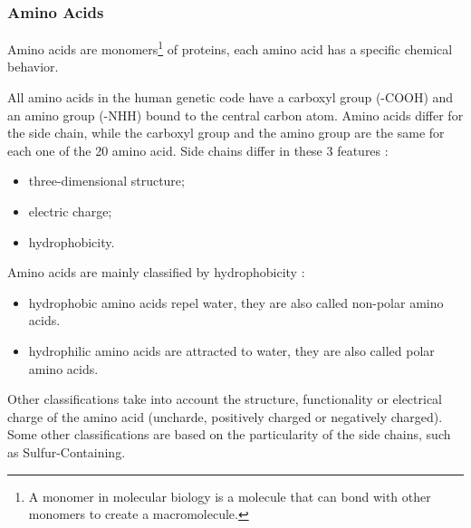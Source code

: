 \subsubsection{Amino Acids}
Amino acids are monomers\footnote{A monomer in molecular biology is a molecule that can bond with other monomers to create a macromolecule. } of proteins, each amino acid has a specific chemical behavior.

All amino acids in the human genetic code have a carboxyl group (-COOH) and an amino group (-NHH) bound to the central carbon atom. Amino acids differ for the side chain, while the carboxyl group and the amino group are the same for each one of the 20 amino acid. Side chains differ in these 3 features :
\begin{itemize}
	\item three-dimensional structure;
	\item electric charge;
	\item hydrophobicity.
\end{itemize}

Amino acids are mainly classified by hydrophobicity :
\begin{itemize}
	\item hydrophobic amino acids repel water, they are also called non-polar amino acids. 
	\item hydrophilic amino acids are attracted to water, they are also called polar amino acids.
\end{itemize}
\pagebreak
Other classifications take into account the structure, functionality or electrical charge of the amino acid (uncharde, positively charged or negatively charged). Some other classifications are based on the particularity of the side chains, such as Sulfur-Containing.


